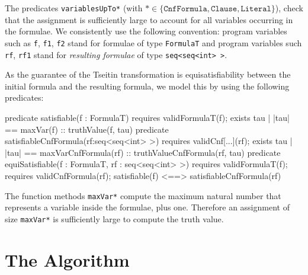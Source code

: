 The predicates \texttt{variablesUpTo*} (with
\(\texttt{*} \in \{ \texttt{CnfFormula}, \allowbreak \texttt{Clause},
\texttt{Literal} \} \)), check that the assignment is sufficiently
large to account for all variables occurring in the formulae. We
consistently use the following convention: program variables such as
\texttt{f}, \texttt{f1}, \texttt{f2} stand for formulae of type
\texttt{FormulaT} and program variables such \texttt{rf}, \texttt{rf1}
stand for \emph{resulting formulae} of type \texttt{seq<seq<int> >}.

As the guarantee of the Tseitin transformation is equisatisfiability
between the initial formula and the resulting formula, we model this
by using the following predicates:

\begin{dafny}
predicate satisfiable(f : FormulaT) requires validFormulaT(f);
{ exists tau | |tau| == maxVar(f) :: truthValue(f, tau) }
predicate satisfiableCnfFormula(rf:seq<seq<int> >) requires validCnf[...](rf);
{ exists tau | |tau| == maxVarCnfFormula(rf) :: truthValueCnfFormula(rf, tau) }
predicate equiSatisfiable(f : FormulaT, rf : seq<seq<int> >)
    requires validFormulaT(f); requires validCnfFormula(rf);
{ satisfiable(f) <==> satisfiableCnfFormula(rf) }
\end{dafny}

The function methods \texttt{maxVar*} compute the maximum natural
number that represents a variable inside the formulae, plus
one. Therefore an assignment of size \texttt{maxVar*} is sufficiently
large to compute the truth value.%


\section{The Algorithm}

